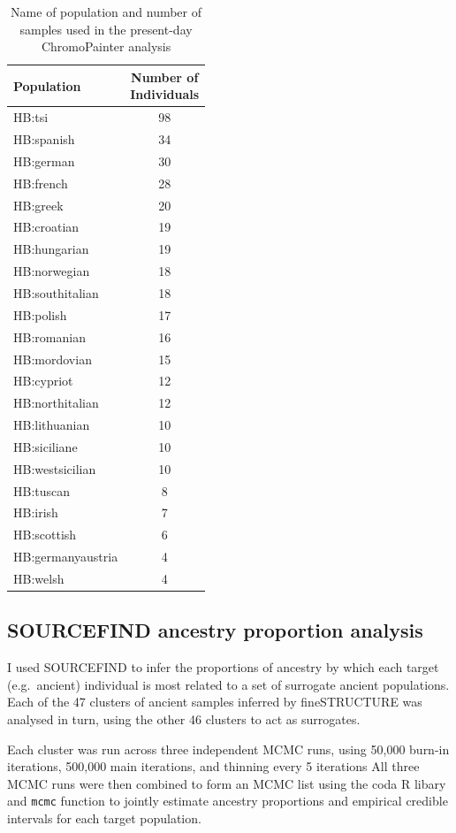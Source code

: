 \begin{table}
\centering
\begin{tabular}[t]{lc}
\toprule
Population & \thead{Number of\\ Individuals}\\
\midrule
HB:tsi & 98\\
HB:spanish & 34\\
HB:german & 30\\
HB:french & 28\\
HB:greek & 20\\
HB:croatian & 19\\
HB:hungarian & 19\\
HB:norwegian & 18\\
HB:southitalian & 18\\
HB:polish & 17\\
HB:romanian & 16\\
HB:mordovian & 15\\
HB:cypriot & 12\\
HB:northitalian & 12\\
HB:lithuanian & 10\\
HB:siciliane & 10\\
HB:westsicilian & 10\\
HB:tuscan & 8\\
HB:irish & 7\\
HB:scottish & 6\\
HB:germanyaustria & 4\\
HB:welsh & 4\\
\bottomrule
\end{tabular}
\caption{Name of population and number of samples used in the present-day ChromoPainter analysis}
\label{table:present-day_inds_painting}
\end{table}

\subsection{SOURCEFIND ancestry proportion analysis}

I used SOURCEFIND \cite{Chacon-Duque2018} to infer the proportions of ancestry by which each target (e.g.\ ancient) individual is most related to a set of surrogate ancient populations. Each of the 47 clusters of ancient samples inferred by fineSTRUCTURE was analysed in turn, using the other 46 clusters to act as surrogates.    

Each cluster was run across three independent MCMC runs, using 50,000 burn-in iterations, 500,000 main iterations, and thinning every 5 iterations All three MCMC runs were then combined to form an MCMC list using the coda R libary \cite{oro22547} and \texttt{mcmc} function to jointly estimate ancestry proportions and empirical credible intervals for each target population. 

